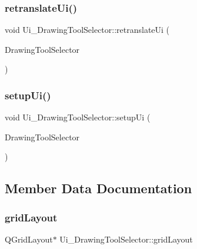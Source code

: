 \subsubsection{\texorpdfstring{retranslate\+Ui()}{retranslateUi()}}
{\footnotesize\ttfamily void Ui\+\_\+\+Drawing\+Tool\+Selector\+::retranslate\+Ui (\begin{DoxyParamCaption}\item[{Q\+Widget $\ast$}]{Drawing\+Tool\+Selector }\end{DoxyParamCaption})\hspace{0.3cm}{\ttfamily [inline]}}

\mbox{\label{class_ui___drawing_tool_selector_a370b1b8993d9c70f9da3d90e53a78686}} 
\subsubsection{\texorpdfstring{setup\+Ui()}{setupUi()}}
{\footnotesize\ttfamily void Ui\+\_\+\+Drawing\+Tool\+Selector\+::setup\+Ui (\begin{DoxyParamCaption}\item[{Q\+Widget $\ast$}]{Drawing\+Tool\+Selector }\end{DoxyParamCaption})\hspace{0.3cm}{\ttfamily [inline]}}



\subsection{Member Data Documentation}
\mbox{\label{class_ui___drawing_tool_selector_a360ae3a69c31e336af215a424ce2ff9d}} 
\subsubsection{\texorpdfstring{grid\+Layout}{gridLayout}}
{\footnotesize\ttfamily Q\+Grid\+Layout$\ast$ Ui\+\_\+\+Drawing\+Tool\+Selector\+::grid\+Layout}

